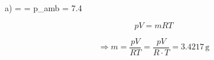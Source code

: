 a) \quad \rho =  =  \Rightarrow p_{amb} = 7.4  \, 

\begin{equation*}
pV = mRT
\end{equation*}

\begin{equation*}
\Rightarrow m = \frac{pV}{RT} = \frac{pV}{R \cdot T} = 3.4217 \, \text{g}
\end{equation*}